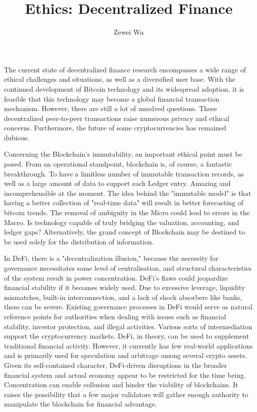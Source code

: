 \documentclass[10pt,twocolumn]{article}
\title{Ethics: Decentralized Finance}
\author{Zewei Wu}
\affiliation{Occidental College}
\begin{document}
\maketitle

\begin{Ethics}
The current state of decentralized finance research encompasses a wide range of ethical challenges and situations, as well as a diversified user base. With the continued development of Bitcoin technology and its widespread adoption, it is feasible that this technology may become a global financial transaction mechanism. However, there are still a lot of unsolved questions. These decentralized peer-to-peer transactions raise numerous privacy and ethical concerns. Furthermore, the future of some cryptocurrencies has remained dubious.

Concerning the Blockchain's immutability, an important ethical point must be posed. From an operational standpoint, blockchain is, of course, a fantastic breakthrough. To have a limitless number of immutable transaction records, as well as a large amount of data to support each Ledger entry. Amazing and incomprehensible at the moment. The idea behind the "immutable model" is that having a better collection of "real-time data" will result in better forecasting of bitcoin trends. The removal of ambiguity in the Micro could lead to errors in the Macro. Is technology capable of truly bridging the valuation, accounting, and ledger gaps? Alternatively, the grand concept of Blockchain may be destined to be used solely for the distribution of information.

In DeFi, there is a "decentralization illusion," because the necessity for governance necessitates some level of centralisation, and structural characteristics of the system result in power concentration. DeFi's flaws could jeopardize financial stability if it becomes widely used. Due to excessive leverage, liquidity mismatches, built-in interconnection, and a lack of shock absorbers like banks, these can be severe. Existing governance processes in DeFi would serve as natural reference points for authorities when dealing with issues such as financial stability, investor protection, and illegal activities. Various sorts of intermediation support the cryptocurrency markets. DeFi, in theory, can be used to supplement traditional financial activity.
However, it currently has few real-world applications and is primarily used for speculation and arbitrage among several crypto assets. Given its self-contained character, DeFi-driven disruptions in the broader financial system and actual economy appear to be restricted for the time being. Concentration can enable collusion and hinder the viability of blockchains. It raises the possibility that a few major validators will gather enough authority to manipulate the blockchain for financial advantage. 


\end{Ethics}
\end{document}
